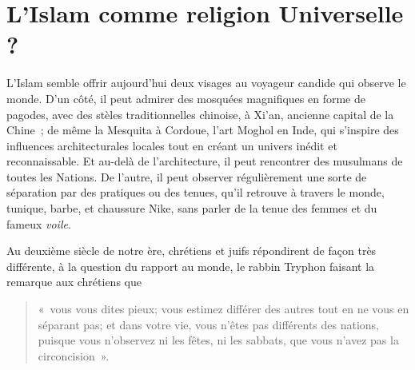 

\chapter{L'Islam comme religion Universelle ?}


L'Islam semble offrir aujourd'hui deux visages au voyageur candide qui
observe le monde. D'un côté, il peut admirer des mosquées magnifiques en
forme de pagodes, avec des stèles traditionnelles chinoise, à Xi'an,
ancienne capital de la Chine~; de même la Mesquita à Cordoue, l'art
Moghol en Inde, qui s'inspire des influences architecturales locales
tout en créant un univers inédit et reconnaissable. Et au-delà de
l'architecture, il peut rencontrer des musulmans de toutes les Nations.
De l'autre, il peut observer régulièrement une sorte de séparation par
des pratiques ou des tenues, qu'il retrouve à travers le monde, tunique,
barbe, et chaussure Nike, sans parler de la tenue des femmes et du
fameux \emph{voile}.

Au deuxième siècle de notre ère, chrétiens et juifs répondirent de façon
très différente, à la question du rapport au monde, le rabbin Tryphon
faisant la remarque aux chrétiens que 
  \begin{quote}
       «~vous
vous dites pieux; vous estimez différer des autres tout en ne vous en
séparant pas; et dans votre vie, vous n'êtes pas différents des nations,
puisque vous n'observez ni les fêtes, ni les sabbats, que vous n'avez
pas la circoncision~».
  \end{quote}



